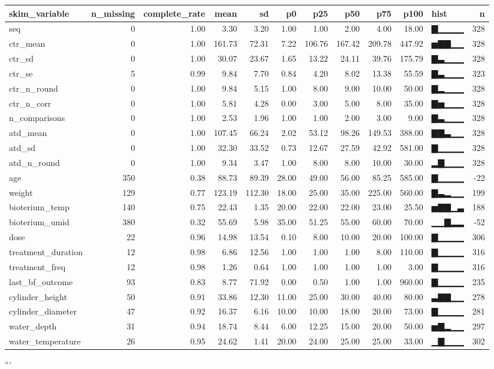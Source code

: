 \documentclass[
]{article}
\begin{document}
\begin{longtable}[]{@{}lrrrrrrrrrlr@{}}
\toprule
skim\_variable & n\_missing & complete\_rate & mean & sd & p0 & p25 &
p50 & p75 & p100 & hist & n \\
\midrule
\endhead
seq & 0 & 1.00 & 3.30 & 3.20 & 1.00 & 1.00 & 2.00 & 4.00 & 18.00 & ▇▁▁▁▁
& 328 \\
ctr\_mean & 0 & 1.00 & 161.73 & 72.31 & 7.22 & 106.76 & 167.42 & 209.78
& 447.92 & ▅▇▇▁▁ & 328 \\
ctr\_sd & 0 & 1.00 & 30.07 & 23.67 & 1.65 & 13.22 & 24.11 & 39.76 &
175.79 & ▇▃▁▁▁ & 328 \\
ctr\_se & 5 & 0.99 & 9.84 & 7.70 & 0.84 & 4.20 & 8.02 & 13.38 & 55.59 &
▇▃▁▁▁ & 323 \\
ctr\_n\_round & 0 & 1.00 & 9.84 & 5.15 & 1.00 & 8.00 & 9.00 & 10.00 &
50.00 & ▇▂▁▁▁ & 328 \\
ctr\_n\_corr & 0 & 1.00 & 5.81 & 4.28 & 0.00 & 3.00 & 5.00 & 8.00 &
35.00 & ▇▅▁▁▁ & 328 \\
n\_comparisons & 0 & 1.00 & 2.53 & 1.96 & 1.00 & 1.00 & 2.00 & 3.00 &
9.00 & ▇▃▁▁▁ & 328 \\
atd\_mean & 0 & 1.00 & 107.45 & 66.24 & 2.02 & 53.12 & 98.26 & 149.53 &
388.00 & ▇▇▃▁▁ & 328 \\
atd\_sd & 0 & 1.00 & 32.30 & 33.52 & 0.73 & 12.67 & 27.59 & 42.92 &
581.00 & ▇▁▁▁▁ & 328 \\
atd\_n\_round & 0 & 1.00 & 9.34 & 3.47 & 1.00 & 8.00 & 8.00 & 10.00 &
30.00 & ▂▇▁▁▁ & 328 \\
age & 350 & 0.38 & 88.73 & 89.39 & 28.00 & 49.00 & 56.00 & 85.25 &
585.00 & ▇▁▁▁▁ & -22 \\
weight & 129 & 0.77 & 123.19 & 112.30 & 18.00 & 25.00 & 35.00 & 225.00 &
560.00 & ▇▃▂▁▁ & 199 \\
bioterium\_temp & 140 & 0.75 & 22.43 & 1.35 & 20.00 & 22.00 & 22.00 &
23.00 & 25.50 & ▅▇▇▁▃ & 188 \\
bioterium\_umid & 380 & 0.32 & 55.69 & 5.98 & 35.00 & 51.25 & 55.00 &
60.00 & 70.00 & ▁▁▇▂▂ & -52 \\
dose & 22 & 0.96 & 14.98 & 13.54 & 0.10 & 8.00 & 10.00 & 20.00 & 100.00
& ▇▁▁▁▁ & 306 \\
treatment\_duration & 12 & 0.98 & 6.86 & 12.56 & 1.00 & 1.00 & 1.00 &
8.00 & 110.00 & ▇▁▁▁▁ & 316 \\
treatment\_freq & 12 & 0.98 & 1.26 & 0.64 & 1.00 & 1.00 & 1.00 & 1.00 &
3.00 & ▇▁▁▁▁ & 316 \\
last\_bf\_outcome & 93 & 0.83 & 8.77 & 71.92 & 0.00 & 0.50 & 1.00 & 1.00
& 960.00 & ▇▁▁▁▁ & 235 \\
cylinder\_height & 50 & 0.91 & 33.86 & 12.30 & 11.00 & 25.00 & 30.00 &
40.00 & 80.00 & ▃▇▇▁▁ & 278 \\
cylinder\_diameter & 47 & 0.92 & 16.37 & 6.16 & 10.00 & 10.00 & 18.00 &
20.00 & 73.00 & ▇▁▁▁▁ & 281 \\
water\_depth & 31 & 0.94 & 18.74 & 8.44 & 6.00 & 12.25 & 15.00 & 20.00 &
50.00 & ▅▇▂▁▁ & 297 \\
water\_temperature & 26 & 0.95 & 24.62 & 1.41 & 20.00 & 24.00 & 25.00 &
25.00 & 33.00 & ▁▇▁▁▁ & 302 \\
\bottomrule
\end{longtable}

```
\end{document}
